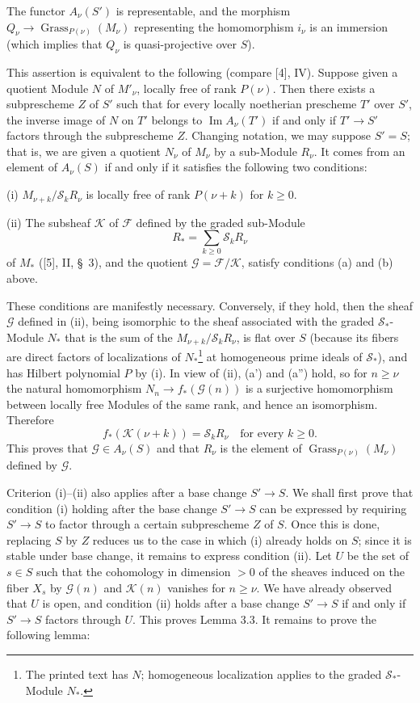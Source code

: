  The functor $A_\nu(S')$ is representable, and the morphism
$Q_\nu\longrightarrow\operatorname{Grass}_{P(\nu)}(M_\nu)$ representing the
homomorphism $i_\nu$ is an immersion (which implies that $Q_\nu$ is
quasi-projective over $S$).

This assertion is equivalent to the following (compare [4], IV). Suppose given
a quotient Module $N$ of $M'_\nu$, locally free of rank $P(\nu)$. Then there
exists a subprescheme $Z$ of $S'$ such that for every locally noetherian
prescheme $T'$
over $S'$, the inverse image of $N$ on $T'$ belongs to
$\operatorname{Im}A_\nu(T')$ if and only if $T'\longrightarrow S'$ factors
through the subprescheme $Z$. Changing notation, we may suppose $S'=S$; that
is, we are given a quotient $N_\nu$ of $M_\nu$ by a sub-Module $R_\nu$. It
comes from an element of $A_\nu(S)$ if and only if it satisfies the following
two conditions:

\medskip
\noindent (i) $M_{\nu+k}/\mathcal S_kR_\nu$ is locally free of rank
$P(\nu+k)$ for $k\geq0$.

\smallskip
\noindent (ii) The subsheaf $\mathcal K$ of $\mathcal F$ defined by the graded
sub-Module
\[
R_* =\sum_{k\geq0}\mathcal S_kR_\nu
\]
of $M_*$ ([5], II, \S~3), and the quotient
$\mathcal G=\mathcal F/\mathcal K$, satisfy conditions (a) and (b) above.

These conditions are manifestly necessary. Conversely, if they hold, then the
sheaf $\mathcal G$ defined in (ii), being isomorphic to the sheaf associated
with the graded $\mathcal S_*$-Module $N_*$ that is the sum of the
$M_{\nu+k}/\mathcal S_kR_\nu$, is flat over $S$ (because its fibers are direct
factors of localizations of $N_*$\footnote{The printed text has $N$; homogeneous localization applies to the graded $\mathcal S_*$-Module $N_*$.} at homogeneous prime ideals of
$\mathcal S_*$), and has Hilbert polynomial $P$ by (i). In view of (ii), (a')
and (a'') hold, so for $n\geq\nu$ the natural homomorphism
$N_n\longrightarrow f_*(\mathcal G(n))$ is a surjective homomorphism between
locally free Modules of the same rank, and hence an isomorphism. Therefore
\[
f_*(\mathcal K(\nu+k))=\mathcal S_kR_\nu
\quad\text{for every $k\geq0$}.
\]
This proves that $\mathcal G\in A_\nu(S)$ and that $R_\nu$ is the element of
$\operatorname{Grass}_{P(\nu)}(M_\nu)$ defined by $\mathcal G$.

Criterion (i)--(ii) also applies after a base change
$S'\longrightarrow S$. We shall first prove that condition (i) holding after
the base change $S'\longrightarrow S$ can be expressed by requiring
$S'\longrightarrow S$ to factor through a certain subprescheme $Z$ of $S$.
Once this is done, replacing $S$ by $Z$ reduces us to the case in which (i)
already holds on $S$; since it is stable under base change, it remains to
express condition (ii). Let $U$ be the set of $s\in S$ such that the
cohomology in dimension $>0$ of the sheaves induced on the fiber $X_s$ by
$\mathcal G(n)$ and $\mathcal K(n)$ vanishes for $n\geq\nu$. We have already
observed that $U$ is open, and condition (ii) holds after a base change
$S'\longrightarrow S$ if and only if $S'\longrightarrow S$ factors through
$U$. This proves Lemma 3.3. It remains to prove the following lemma:

